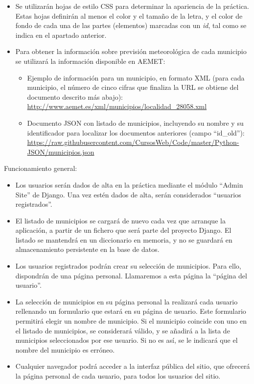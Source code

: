 \begin{itemize}
\item Se utilizarán hojas de estilo CSS para determinar la apariencia de la práctica. Estas hojas definirán al menos el color y el tamaño de la letra, y el color de fondo de cada una de las partes (elementos) marcadas con un \emph{id}, tal como se indica en el apartado anterior.

\item Para obtener la información sobre previsión meteorológica de cada municipio se utilizará la información disponible en AEMET:

  \begin{itemize}
  \item Ejemplo de información para un municipio, en formato XML
    (para cada municipio, el número de cinco cifras que finaliza la URL
    se obtiene del documento descrito más abajo): \\
    \url{http://www.aemet.es/xml/municipios/localidad_28058.xml}
  \item Documento JSON con listado de municipios, incluyendo su nombre y
    su identificador para localizar los documentos anteriores (campo ``id\_old''): \\
    \url{https://raw.githubusercontent.com/CursosWeb/Code/master/Python-JSON/municipios.json}
  \end{itemize}
  
\end{itemize}

Funcionamiento general:

\begin{itemize}
  \item Los usuarios serán dados de alta en la práctica mediante el módulo ``Admin Site'' de Django. Una vez estén dados de alta, serán considerados ``usuarios registrados''.

  \item El listado de municipios se cargará de nuevo cada vez que arranque la aplicación, a partir de un fichero que será parte del proyecto Django. El listado se mantendrá en un diccionario en memoria, y no se guardará en almacenamiento persistente en la base de datos.

  \item Los usuarios registrados podrán crear su selección de municipios. Para ello, dispondrán de una página personal. Llamaremos a esta página la ``página del usuario''.

  \item La selección de municipios en su página personal la realizará cada usuario rellenando un formulario que estará en su página de usuario. Este formulario permitirá elegir un nombre de municipio. Si el municipio coincide con uno en el listado de municipios, se considerará válido, y se añadirá a la lista de municipios seleccionados por ese usuario. Si no es así, se le indicará que el nombre del municipio es erróneo.

  \item Cualquier navegador podrá acceder a la interfaz pública del sitio, que ofrecerá la página personal de cada usuario, para todos los usuarios del sitio.

\end{itemize}


